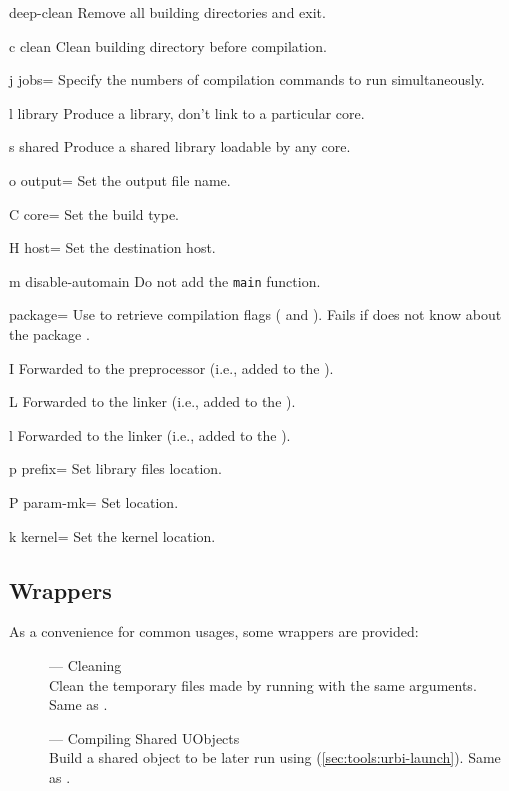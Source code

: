 \begin{options}
\item{deep-clean} Remove all building directories and exit.
\item[c]{clean} Clean building directory before compilation.
\item[j]{jobs=} Specify the numbers of compilation commands to run
  simultaneously.
\item[l]{library} Produce a library, don't link to a particular core.
\item[s]{shared} Produce a shared library loadable by any core.
\item[o]{output=} Set the output file name.
\item[C]{core=} Set the build type.
\item[H]{host=} Set the destination host.
\item[m]{disable-automain} Do not add the \lstinline|main| function.
\item{package=} Use  to retrieve compilation
  flags ( and ).  Fails if  does
  not know about the package .
\item[I\var{path}]{} Forwarded to the preprocessor (i.e., added to the
  ).
\item[L\var{path}]{} Forwarded to the linker (i.e., added to the
  ).
\item[l\var{lib}]{} Forwarded to the linker (i.e., added to the
  ).
\end{options}

\begin{options}
\item[p]{prefix=} Set library files location.
\item[P]{param-mk=} Set  location.
\item[k]{kernel=} Set the kernel location.
\end{options}


\subsection{ Wrappers}
\label{sec:tools:umake:wrappers}

As a convenience for common  usages, some wrappers are
provided:
\begin{description}
\item[] --- Cleaning\\
  Clean the temporary files made by running  with the
  same arguments.  Same as .
\item[] --- Compiling Shared UObjects\\
  Build a shared object to be later run using 
  (\autoref{sec:tools:urbi-launch}).  Same as .
\end{description}

